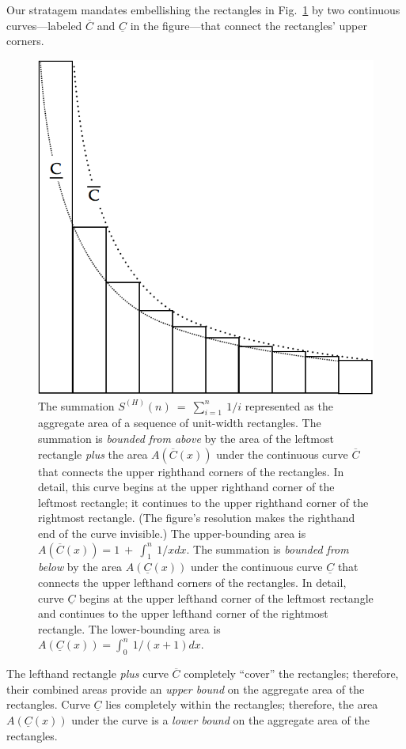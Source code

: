 \begin{enumerate}
Our stratagem mandates embellishing the rectangles in Fig.~\ref{fig:riemann-harmonic} by two continuous curves---labeled $\overline{C}$ and $\underline{C}$ in the figure---that connect the rectangles' upper corners.
\begin{figure}[htb]
\centerline{
\includegraphics[scale=0.3]{FiguresMaths/RiemannSum}
}
\caption{The summation $S^{(H)}(n) \ = \ \sum_{i=1}^n \ 1/i$ represented as the aggregate area of a sequence of unit-width rectangles.  The summation is {\em bounded from above} by the area of the leftmost rectangle {\em plus} the area $A(\overline{C}(x))$ under the continuous curve $\overline{C}$ that connects the upper righthand corners of the rectangles.  In detail, this curve begins at the upper righthand corner of the leftmost rectangle; it continues to the upper righthand corner of the rightmost rectangle.  (The figure's resolution makes the righthand end of the curve invisible.)  The upper-bounding area is $A(\overline{C}(x)) = 1 \ + \ \int_1^n \ 1/x dx$.  The summation is {\em bounded from below} by the area $A(\underline{C}(x))$ under the continuous curve $\underline{C}$ that connects the upper lefthand corners of the rectangles.  In detail, curve $\underline{C}$ begins at the upper lefthand corner of the leftmost rectangle and continues to the upper lefthand corner of the rightmost rectangle.  The lower-bounding area is $A(\underline{C}(x)) =  \int_0^n \ 1/(x+1) dx$.}
\label{fig:riemann-harmonic}
\end{figure}
The lefthand rectangle {\em plus} curve $\overline{C}$ completely ``cover'' the rectangles; therefore, their combined areas provide an {\em upper bound} on the aggregate area of the rectangles.  Curve $\underline{C}$ lies completely within the rectangles; therefore, the area $A(\underline{C}(x))$ under the curve is a {\em lower bound} on the aggregate area of the rectangles.
\end{enumerate}

